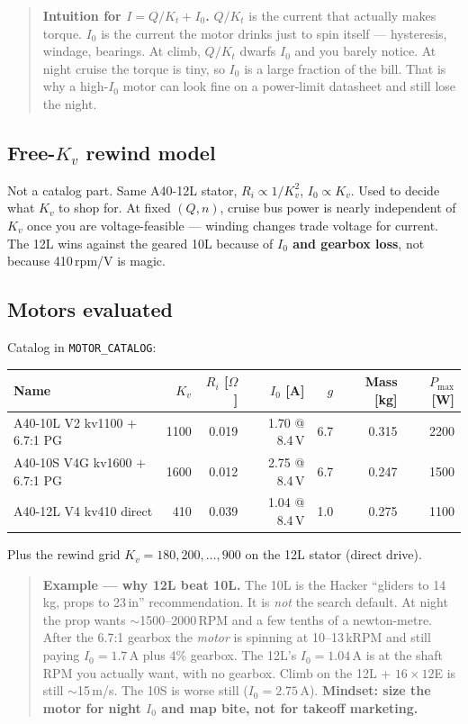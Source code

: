 \documentclass[11pt,letterpaper]{article}
\newcommand{\code}[1]{\texttt{#1}}
\newenvironment{intuition}{\begin{quote}\small}{\end{quote}}
\newenvironment{examplebox}{\begin{quote}\small}{\end{quote}}
\begin{document}
\begin{intuition}
\textbf{Intuition for $I = Q/K_t + I_0$.} $Q/K_t$ is the current that actually makes torque. $I_0$ is the current the motor drinks just to spin itself --- hysteresis, windage, bearings. At climb, $Q/K_t$ dwarfs $I_0$ and you barely notice. At night cruise the torque is tiny, so $I_0$ is a large fraction of the bill. That is why a high-$I_0$ motor can look fine on a power-limit datasheet and still lose the night.
\end{intuition}

\subsection{Free-$K_v$ rewind model}

Not a catalog part. Same A40-12L stator, $R_i \propto 1/K_v^2$, $I_0 \propto K_v$. Used to decide what $K_v$ to shop for. At fixed $(Q, n)$, cruise bus power is nearly independent of $K_v$ once you are voltage-feasible --- winding changes trade voltage for current. The 12L wins against the geared 10L because of \textbf{$I_0$ and gearbox loss}, not because 410\,rpm/V is magic.

\subsection{Motors evaluated}
\label{sec:motors}

Catalog in \code{MOTOR\_CATALOG}:

\begin{center}
\begin{tabular}{@{}lrrrrrr@{}}
\toprule
Name & $K_v$ & $R_i$ [$\Omega$] & $I_0$ [A] & $g$ & Mass [kg] & $P_\max$ [W] \\
\midrule
A40-10L V2 kv1100 + 6.7:1 PG & 1100 & 0.019 & 1.70 @ 8.4\,V & 6.7 & 0.315 & 2200 \\
A40-10S V4G kv1600 + 6.7:1 PG & 1600 & 0.012 & 2.75 @ 8.4\,V & 6.7 & 0.247 & 1500 \\
A40-12L V4 kv410 direct & 410 & 0.039 & 1.04 @ 8.4\,V & 1.0 & 0.275 & 1100 \\
\bottomrule
\end{tabular}
\end{center}

Plus the rewind grid $K_v = 180, 200, \ldots, 900$ on the 12L stator (direct drive).

\begin{examplebox}
\textbf{Example --- why 12L beat 10L.}
The 10L is the Hacker ``gliders to 14\,kg, props to 23\,in'' recommendation. It is \emph{not} the search default. At night the prop wants $\sim$1500--2000\,RPM and a few tenths of a newton-metre. After the 6.7:1 gearbox the \emph{motor} is spinning at 10--13\,kRPM and still paying $I_0 = 1.7\,\mathrm{A}$ plus 4\% gearbox. The 12L's $I_0 = 1.04\,\mathrm{A}$ is at the shaft RPM you actually want, with no gearbox. Climb on the 12L + $16\times12$E is still $\sim$15\,m/s. The 10S is worse still ($I_0 = 2.75\,\mathrm{A}$). \textbf{Mindset: size the motor for night $I_0$ and map bite, not for takeoff marketing.}
\end{examplebox}
\end{document}
